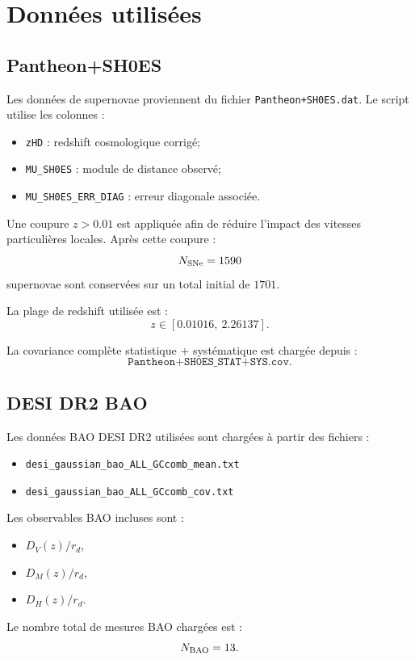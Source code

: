 \documentclass[11pt]{article}
\begin{document}
\section{Données utilisées}

\subsection{Pantheon+SH0ES}

Les données de supernovae proviennent du fichier \texttt{Pantheon+SH0ES.dat}. Le script utilise les colonnes :
\begin{itemize}
    \item \texttt{zHD} : redshift cosmologique corrigé;
    \item \texttt{MU\_SH0ES} : module de distance observé;
    \item \texttt{MU\_SH0ES\_ERR\_DIAG} : erreur diagonale associée.
\end{itemize}

Une coupure $z>0.01$ est appliquée afin de réduire l'impact des vitesses particulières locales. Après cette coupure :
\[
    N_{\rm SNe} = 1590
\]
supernovae sont conservées sur un total initial de $1701$.

La plage de redshift utilisée est :
\[
    z \in [0.01016,\ 2.26137].
\]

La covariance complète statistique + systématique est chargée depuis :
\[
    \texttt{Pantheon+SH0ES\_STAT+SYS.cov}.
\]

\subsection{DESI DR2 BAO}

Les données BAO DESI DR2 utilisées sont chargées à partir des fichiers :
\begin{itemize}
    \item \texttt{desi\_gaussian\_bao\_ALL\_GCcomb\_mean.txt}
    \item \texttt{desi\_gaussian\_bao\_ALL\_GCcomb\_cov.txt}
\end{itemize}

Les observables BAO incluses sont :
\begin{itemize}
    \item $D_V(z)/r_d$,
    \item $D_M(z)/r_d$,
    \item $D_H(z)/r_d$.
\end{itemize}

Le nombre total de mesures BAO chargées est :
\[
    N_{\rm BAO} = 13.
\]
\end{document}
